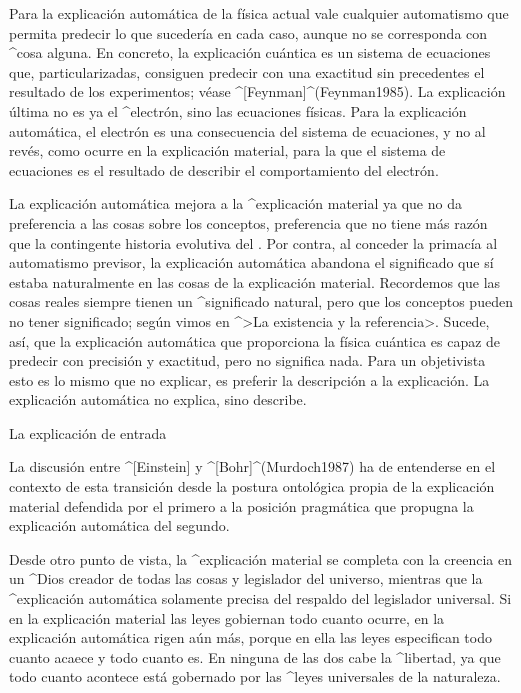 Para la explicación automática de la física actual vale cualquier
automatismo que permita predecir lo que sucedería en cada
caso,\vadjust{\null\vfil\break} aunque no se corresponda con ^{cosa}
alguna. En concreto, la explicación cuántica es un sistema de ecuaciones
que, particularizadas, consiguen predecir con una exactitud sin
precedentes el resultado de los experimentos; véase
^[Feynman]^(Feynman1985). La explicación última no es ya el ^{electrón},
sino las ecuaciones físicas. Para la explicación automática, el electrón
es una consecuencia del sistema de ecuaciones, y no al revés, como
ocurre en la explicación material, para la que el sistema de ecuaciones
es el resultado de describir el comportamiento del electrón.

La explicación automática mejora a la ^{explicación material} ya que no
da preferencia a las cosas sobre los conceptos, preferencia que no tiene
más razón que la contingente historia evolutiva del . Por contra, al conceder la primacía al automatismo previsor,
la explicación automática abandona el significado que sí estaba
naturalmente en las cosas de la explicación material. Recordemos que las
cosas reales siempre tienen un ^{significado} natural, pero que los
conceptos pueden no tener significado; según vimos en ^>La existencia y
la referencia>. Sucede, así, que la explicación automática que
proporciona la física cuántica es capaz de predecir con precisión y
exactitud, pero no significa nada. Para un objetivista esto es lo mismo
que no explicar, es preferir la descripción a la explicación. La
explicación automática no explica, sino describe.


\Section La explicación de entrada

La discusión entre ^[Einstein] y ^[Bohr]^(Murdoch1987) ha de entenderse
en el contexto de esta transición desde la postura ontológica propia de
la explicación material defendida por el primero a la posición
pragmática que propugna la explicación automática del segundo.

Desde otro punto de vista, la ^{explicación material} se completa con la
creencia en un ^{Dios} creador de todas las cosas y legislador del
universo, mientras que la ^{explicación automática} solamente precisa
del respaldo del legislador universal. Si en la explicación material las
leyes gobiernan todo cuanto ocurre, en la explicación automática rigen
aún más, porque en ella las leyes especifican todo cuanto acaece y todo
cuanto es. En ninguna de las dos cabe la ^{libertad}, ya que todo cuanto
acontece está gobernado por las ^{leyes universales} de la naturaleza.

